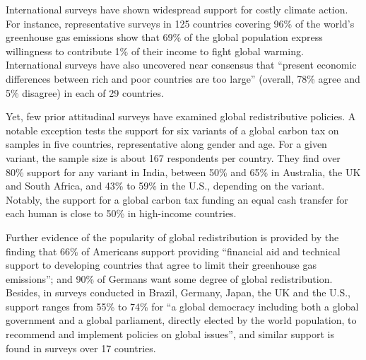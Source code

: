 \begin{bibunit}
International surveys have shown widespread support for costly climate action.\citep{dechezlepretre_fighting_nodate,leiserowitz_international_2022} For instance, representative surveys in 125 countries covering 96\% of the world's greenhouse gas emissions show that 69\% of the global population express willingness to contribute 1\% of their income to fight global warming.\cite{andre_globally_2024} International surveys have also uncovered near consensus that ``present economic differences between rich and poor countries are too large'' (overall, 78\% agree and 5\% disagree) in each of 29 countries.\citep{issp_international_2019} 

Yet, few prior attitudinal surveys have examined global redistributive policies. 
A notable exception tests the support for six variants of a global carbon tax on samples in five countries, representative along gender and age.\cite{carattini_how_2019} For a given variant, the sample size is about 167 respondents per country. They find over 80\% support for any variant in India, between 50\% and 65\% in Australia, the UK and South Africa, and 43\% to 59\% in the U.S., depending on the variant. Notably, the support for a global carbon tax funding an equal cash transfer for each human is close to 50\% in high-income countries. %

Further evidence of the popularity of global redistribution is provided by the finding that 66\% of Americans support providing ``financial aid and technical support to developing countries that agree to limit their greenhouse gas emissions'';\cite{leiserowitz_public_2021} and 90\% of Germans want some degree of global redistribution.\cite{fehr_your_2022} 
Besides, in surveys conducted in Brazil, Germany, Japan, the UK and the U.S., support ranges from 55\% to 74\% for ``a global democracy including both a global government and a global parliament, directly elected by the world population, to recommend and implement policies on global issues'', and similar support is found in surveys over 17 countries.\cite{ghassim_who_2020,ghassim_who_2024} %


\end{bibunit}
